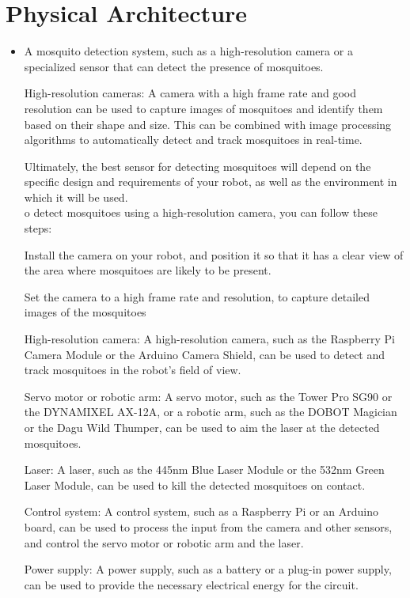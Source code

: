 \documentclass[11pt]{article}
\begin{document}
	\section{Physical Architecture}
	\begin{itemize}
		
		\item A mosquito detection system, such as a high-resolution camera or a specialized sensor that can detect the presence of mosquitoes.
		
		High-resolution cameras: A camera with a high frame rate and good resolution can be used to capture images of mosquitoes and identify them based on their shape and size. This can be combined with image processing algorithms to automatically detect and track mosquitoes in real-time.
		
		Ultimately, the best sensor for detecting mosquitoes will depend on the specific design and requirements of your robot, as well as the environment in which it will be used.
		\\
		o detect mosquitoes using a high-resolution camera, you can follow these steps:
		
		Install the camera on your robot, and position it so that it has a clear view of the area where mosquitoes are likely to be present.
		
		Set the camera to a high frame rate and resolution, to capture detailed images of the mosquitoes
		
		
		
		High-resolution camera: A high-resolution camera, such as the Raspberry Pi Camera Module or the Arduino Camera Shield, can be used to detect and track mosquitoes in the robot's field of view.
		
		
		Servo motor or robotic arm: A servo motor, such as the Tower Pro SG90 or the DYNAMIXEL AX-12A, or a robotic arm, such as the DOBOT Magician or the Dagu Wild Thumper, can be used to aim the laser at the detected mosquitoes.
		
		Laser: A laser, such as the 445nm Blue Laser Module or the 532nm Green Laser Module, can be used to kill the detected mosquitoes on contact.
		
		Control system: A control system, such as a Raspberry Pi or an Arduino board, can be used to process the input from the camera and other sensors, and control the servo motor or robotic arm and the laser.
		
		Power supply: A power supply, such as a battery or a plug-in power supply, can be used to provide the necessary electrical energy for the circuit.
		

\end{itemize}
\end{document}
